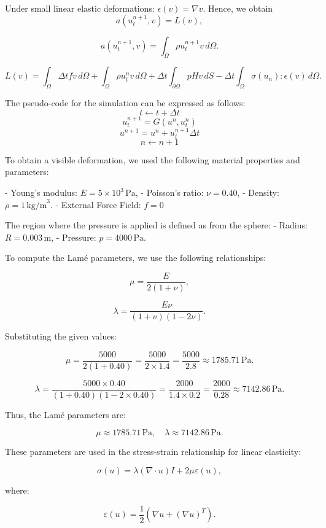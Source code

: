 \documentclass[a4paper,12pt]{article}
\begin{document}
Under small linear elastic deformations: $\epsilon(v) = \nabla v$. Hence, we obtain
\[
	a(u_t^{n+1}, v) = L(v),
\]

\[
	a(u_t^{n+1}, v) = \int_\Omega \rho u_t^{n+1} v \, d\Omega.
\]

\[
	L(v) = \int_\Omega \Delta t f v \, d\Omega + \int_\Omega \rho u_t^n v \, d\Omega + \Delta t \int_{\partial \Omega} p H v \, dS - \Delta t \int_\Omega \sigma(u_n) : \epsilon(v) \, d\Omega.
\]

The pseudo-code for the simulation can be expressed as follows:
\[
	t \gets t + \Delta t
\]
\[
	u_t^{n+1} = G(u^n, u_t^n)
\]
\[
	u^{n+1} = u^n + u_t^{n+1}  \Delta t
\]
\[
	n \gets n + 1
\]

\newpage

To obtain a visible deformation, we used the following material properties and parameters:

- Young's modulus: \( E = 5 \times 10^3 \, \text{Pa} \),
- Poisson's ratio: \( \nu = 0.40 \),
- Density: \( \rho = 1 \, \text{kg/m}^3 \).
- External Force Field: $f=0$

The region where the pressure is applied is defined as from the sphere:
- Radius: \( R = 0.003 \, \text{m} \),
- Pressure: \( p = 4000 \, \text{Pa} \).

To compute the Lamé parameters, we use the following relationships:

\[
	\mu = \frac{E}{2(1 + \nu)},
\]

\[
	\lambda = \frac{E \nu}{(1 + \nu)(1 - 2\nu)}.
\]

Substituting the given values:

\[
	\mu = \frac{5000}{2(1 + 0.40)} = \frac{5000}{2 \times 1.4} = \frac{5000}{2.8} \approx 1785.71 \, \text{Pa}.
\]

\[
	\lambda = \frac{5000 \times 0.40}{(1 + 0.40)(1 - 2 \times 0.40)} = \frac{2000}{1.4 \times 0.2} = \frac{2000}{0.28} \approx 7142.86 \, \text{Pa}.
\]

Thus, the Lamé parameters are:

\[
	\mu \approx 1785.71 \, \text{Pa}, \quad \lambda \approx 7142.86 \, \text{Pa}.
\]

These parameters are used in the stress-strain relationship for linear elasticity:

\[
	\sigma(u) = \lambda (\nabla \cdot u) I + 2 \mu \varepsilon(u),
\]

where:

\[
	\varepsilon(u) = \frac{1}{2} \left( \nabla u + (\nabla u)^T \right).
\]
\end{document}
